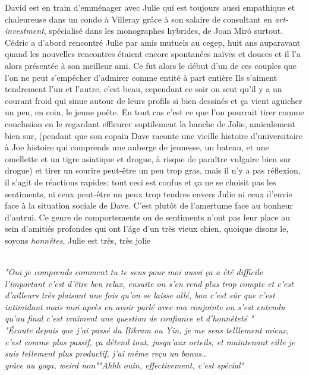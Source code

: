 \begin{paracol}{2}
\begin{rightcolumn} David est en train d'emménager avec Julie qui est
            toujours aussi empathique et chaleureuse dans un condo à Villeray
	    grâce à son salaire de consultant en \textit{art-investment}, 
    spécialisé dans les monographes hybrides, de Joan Mir\'o surtout. Cédric a
    d'abord rencontré Julie par amis mutuels au cegep, huit ans auparavant
    quand les nouvelles rencontres étaient encore spontanées naïves et douces
    et il l'a alors présentée à son meilleur ami. Ce fut alors le début d'un de
    ces couples que l'on ne peut s'empêcher d'admirer comme entité à part entière
    Ils s'aiment tendrement l'un et l'autre, c'est beau, cependant ce soir on sent
    qu'il y a un courant froid qui sinue autour de leurs profils si
    bien dessinés et ça vient aguicher un peu, en coin, le jeune poête. En
    tout cas c'est ce que l'on pourrait tirer comme conclusion en le regardant
    effleurer suptilement la hanche de Jolie, amicalement bien sur, (pendant
    que son copain Dave raconte une vieille histoire d'universitaire à Joe histoire
    qui comprends une auberge de jeunesse, un bateau, et une omellette et un
    tigre asiatique et drogue, à risque de paraître vulgaire bien sur drogue)
    et tirer un sourire peut-être un peu trop gras, mais il
    n'y a pas réflexion, il s'agit de réactions rapides; tout ceci est confus
    et ça ne se choisit pas les sentiments, ni ceux peut-être un peux trop
    tendres envers Julie ni ceux d'envie face à la situation sociale de Dave.
    C'est plutôt de l'amertume face au bonheur d'autrui. Ce genre de comportements
    ou de sentiments n'ont pas leur place au sein d'amitiés profondes qui ont
    l'âge d'un très vieux chien, quoique disons le,
    soyons \emph{honnêtes}, Julie est très, très jolie \\
\end{rightcolumn}
\begin{leftcolumn} \phantom\\\vspace{5em}
 \phantom{}
\small
            \textit{"Oui je comprends comment tu te sens pour moi aussi ça a été
                difficile l'important c'est d'être ben relax, ensuite on s'en
                rend plus trop compte et c'est d'ailleurs très plaisant une fois
                qu'on se laisse allé, bon c'est sûr que c'est intimidant mais
        moi après en avoir parlé avec ma conjointe on s'est entendu qu'au final
c'est vraiment une question de confiance et d'honnêteté \textelp{}"}\\[10em]
\textit{"Écoute depuis que j'ai passé du Bikram ou Yin, je me sens telllement
	mieux, c'est comme plus passif, ça détend tout, jusqu'aux orteils, et
	maintenant eille je suis tellement plus productif, j'ai même reçu un
	bonus\ldots\\grâce au yoga, weird non""Ahhh ouin, effectivement, c'est
spécial"}
\end{leftcolumn}
\end{paracol}
